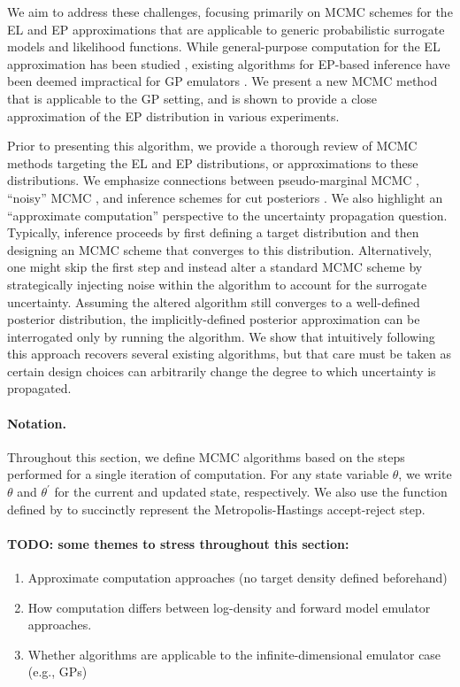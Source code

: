 \documentclass[12pt]{article}
\begin{document}
We aim to address these challenges, focusing primarily on MCMC schemes for the EL
and EP approximations that are applicable to generic probabilistic surrogate models 
and likelihood functions. While general-purpose computation for the EL approximation 
has been studied \citep{garegnani2021NoisyMCMC}, existing algorithms for EP-based 
inference have been deemed impractical for GP emulators \citep{VehtariParallelGP,StuartTeck2}.
We present a new MCMC method that is applicable to the GP setting, and is
shown to provide a close approximation of the EP distribution in various experiments.

Prior to presenting this algorithm, we provide a thorough review of MCMC methods
targeting the EL and EP distributions, or approximations to these distributions. 
We emphasize connections between pseudo-marginal MCMC \citep{pseudoMarginalMCMC}, 
``noisy'' MCMC \citep{noisyMCMC}, and inference schemes for cut 
posteriors \citep{PlummerCut}. We also highlight an ``approximate computation'' 
perspective to the uncertainty propagation question. Typically, inference proceeds
by first defining a target distribution and then designing an MCMC scheme that
converges to this distribution. Alternatively, one might skip the first step and instead 
alter a standard MCMC scheme by strategically injecting noise within the 
algorithm to account for the surrogate uncertainty. Assuming the altered algorithm 
still converges to a well-defined posterior distribution, the implicitly-defined posterior 
approximation can be interrogated only by running the algorithm.
We show that intuitively following this approach recovers several existing algorithms, 
but that care must be taken as certain design choices can arbitrarily change the 
degree to which uncertainty is propagated.

\paragraph{Notation.} Throughout this section, we define MCMC algorithms
based on the steps performed for a single iteration of computation. For any 
state variable $\theta$, we write $\theta$ and $\theta^\prime$ for the current
and updated state, respectively. We also use the function defined by 
 to succinctly represent the Metropolis-Hastings
accept-reject step.

\paragraph{TODO: some themes to stress throughout this section:}
\begin{enumerate}
\item Approximate computation approaches (no target density defined beforehand)
\item How computation differs between log-density and forward model emulator approaches.
\item Whether algorithms are applicable to the infinite-dimensional emulator case (e.g., GPs)
\end{enumerate}
\end{document}
